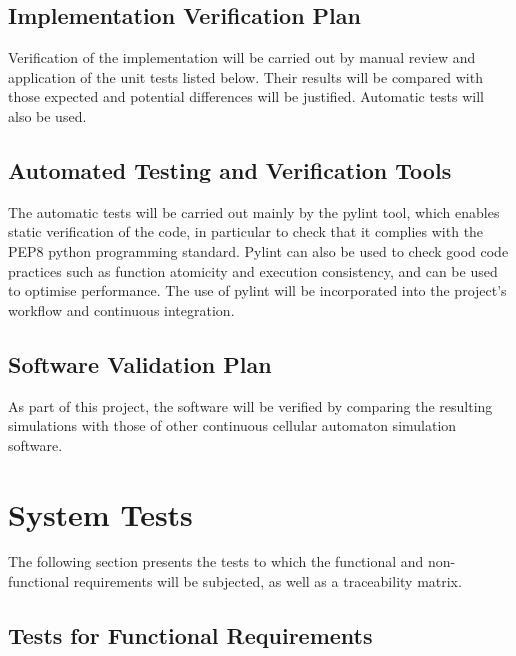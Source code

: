 \documentclass[12pt, titlepage]{article}
\begin{document}
\subsection{Implementation Verification Plan}

Verification of the implementation will be carried out by manual review and application of the unit tests listed below. 
Their results will be compared with those expected and potential differences will be justified.
Automatic tests will also be used.

\subsection{Automated Testing and Verification Tools}

The automatic tests will be carried out mainly by the pylint tool, which enables static verification of the code, in particular to check that it complies with the PEP8 python programming standard.
Pylint can also be used to check good code practices such as function atomicity and execution consistency, and can be used to optimise performance.
The use of pylint will be incorporated into the project's workflow and continuous integration.

\subsection{Software Validation Plan}

As part of this project, the software will be verified by comparing the resulting simulations with those of other continuous cellular automaton simulation software.

\section{System Tests}

The following section presents the tests to which the functional and non-functional requirements will be subjected, as well as a traceability matrix.

\subsection{Tests for Functional Requirements}

\end{document}
